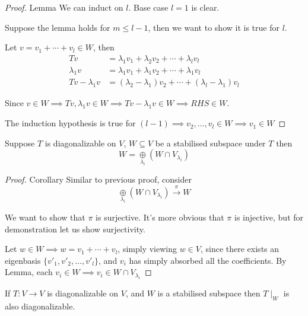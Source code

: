 \begin{proof} {Lemma}
    We can induct on \(l\). Base case \(l = 1\) is clear.

    Suppose the lemma holds for \(m \leq l-1\), then we want to show it is true for \(l\).

    Let \(v = v_1 + \cdots + v_l \in W\), then
    \begin{align*}
        Tv               & = \lambda_1 v_1 + \lambda_2 v_2 + \cdots + \lambda_l v_l             \\
        \lambda_1 v      & = \lambda_1 v_1 + \lambda_1 v_2 + \cdots + \lambda_1 v_l             \\
        Tv - \lambda_1 v & = (\lambda_2 - \lambda_1) v_2 + \cdots + (\lambda_l - \lambda_1) v_l
    \end{align*}

    Since \(v \in W \implies Tv, \lambda_1 v \in W \implies Tv - \lambda_1 v \in W \implies RHS \in W\).

    The induction hypothesis is true for \((l-1) \implies v_2, \ldots, v_l \in W \implies v_1 \in W\)
\end{proof}

\begin{corollary}
    Suppose \(T\) is diagonalizable on \(V\), \(W \subseteq V\) be a stabilised subspace under \(T\) then \[
        W = \underset{\lambda_i}{\oplus}  (W \cap V_{\lambda_i})
    \]
\end{corollary}

\begin{proof} {Corollary}
    Similar to previous proof, consider \[
        \underset{\lambda_i}{\oplus}  (W \cap V_{\lambda_i}) \xrightarrow{\pi} W 
    \]

    We want to show that \(\pi\) is surjective. It's more obvious that \(\pi\) is injective, but for demonstration let us show surjectivity.

    Let \(w \in W \implies w = v_1 + \cdots + v_l\), simply viewing \(w \in V\), since there exists an eigenbasis \(\{v'_1, v'_2, \dots, v'_l\}\), and \(v_i\) has simply absorbed all the coefficients. By Lemma, each \(v_i \in W \implies v_i \in W \cap V_{\lambda_i}\)
\end{proof}

\begin{corollary}
If \(T : V \to V\) is diagonalizable on \(V\), and \(W\) is a stabilised subspace then \(T\mid_W\) is also diagonalizable.
\end{corollary}